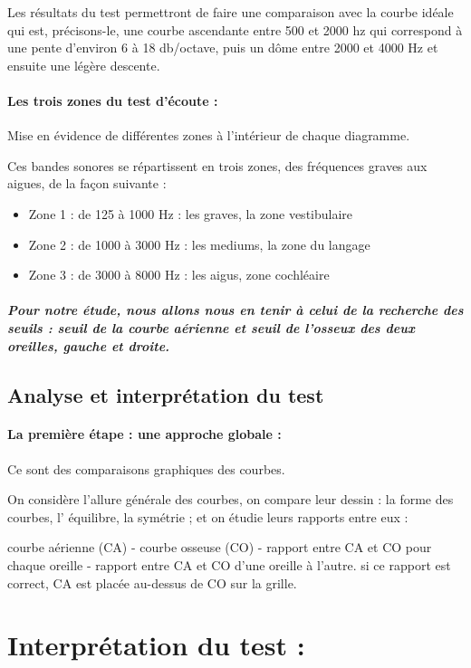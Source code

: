 Les résultats du test permettront de faire une comparaison avec la
courbe idéale qui est, précisons-le, une courbe ascendante entre 500 et 2000
hz qui correspond à une pente d\textquoteright environ 6 à 18 db/octave,
puis un dôme entre 2000 et 4000 Hz et ensuite une légère descente. 

\paragraph{Les trois zones du test d'écoute : }

Mise en évidence de différentes zones à l\textquoteright intérieur
de chaque diagramme. 

Ces bandes sonores se répartissent en trois zones, des fréquences
graves aux aigues, de la façon suivante :
\begin{itemize}
\item Zone 1 : de 125 à 1000 Hz : les graves, la zone vestibulaire
\item Zone 2 : de 1000 à 3000 Hz : les mediums, la zone du langage
\item Zone 3 : de 3000 à 8000 Hz : les aigus, zone cochléaire
\end{itemize}

\subparagraph*{Pour notre étude, nous allons nous en tenir à celui de la recherche
des seuils : seuil de la courbe aérienne et seuil de l'osseux des
deux oreilles, gauche et droite.}


\subsection*{Analyse et interprétation du test}
\paragraph{La première étape : une approche globale : }

Ce sont des comparaisons graphiques des courbes. 

On considère l'allure générale des courbes, on compare leur dessin
: la forme des courbes, l' équilibre, la symétrie ; et on étudie leurs
rapports entre eux : 

courbe aérienne (CA) - courbe osseuse (CO) - rapport entre CA et CO
pour chaque oreille - rapport entre CA et CO d\textquoteright une
oreille à l'autre. si ce rapport est correct, CA est placée au-dessus
de CO sur la grille.
\section{Interprétation du test : }


